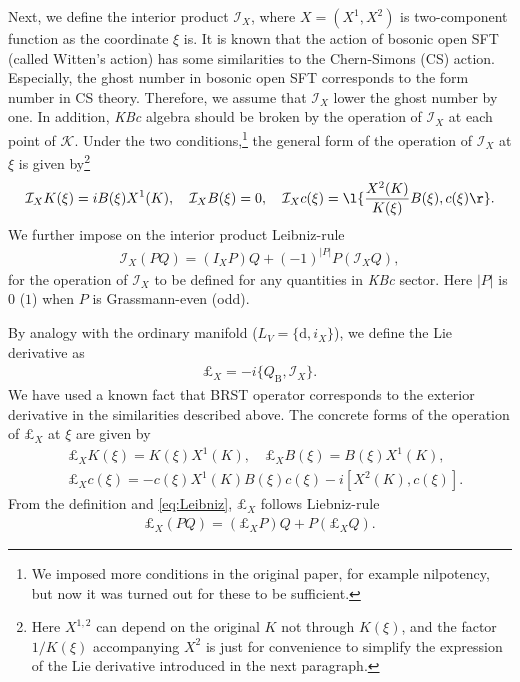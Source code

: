 \documentclass[12pt]{article}
\begin{document}
Next, we define the interior product $\mathcal I_X$, where $X = (X^1,X^2)$ is two-component function as the coordinate $\xi$ is.
It is known that the action of bosonic open SFT (called Witten's action) has some similarities to the Chern-Simons (CS) action.
Especially, the ghost number in bosonic open SFT corresponds to the form number in CS theory.
Therefore, we assume that $\mathcal I_X$ lower the ghost number by one.
In addition, \textit{KBc} algebra should be broken by the operation of $\mathcal I_X$ at each point of $\mathcal K$.
Under the two conditions,\footnote{
We imposed more conditions in the original paper, for example nilpotency, but now it was turned out for these to be sufficient.}
the general form of the operation of $\mathcal I_X$ at $\xi$ is given by\footnote{
Here $X^{1,2}$ can depend on the original $K$ not through $K(\xi)$, and the factor $1/K(\xi)$ accompanying $X^2$ is just for convenience to simplify the expression of the Lie derivative introduced in the next paragraph.
}
\begin{align}
	\mathcal I_X K(\xi)= iB(\xi)X^1(K),\quad
	\mathcal I_X B(\xi) = 0,\quad
	\mathcal I_X c(\xi) = \l\{\frac{X^2(K)}{K(\xi)}B(\xi),c(\xi)\r\}.
\end{align}
We further impose on the interior product Leibniz-rule
\begin{align}
	\mathcal I_X (PQ) = (I_X P)Q + (-1)^{|P|}P(\mathcal I_X Q),\label{eq:Leibniz}
\end{align}
for the operation of $\mathcal I_X$ to be defined for any quantities in \textit{KBc} sector.
Here $|P|$ is $0$ ($1$) when $P$ is Grassmann-even (odd).

By analogy with the ordinary manifold ($L_V = \{\mathrm{d},i_X\}$), we define the Lie derivative as
\begin{align}
	\pounds_X = -i\{Q_\mathrm{B},\mathcal I_X\}.
\end{align}
We have used a known fact that BRST operator corresponds to the exterior derivative in the similarities described above.
The concrete forms of the operation of $\pounds_X$ at $\xi$ are given by
\begin{align}
	&\pounds_X K(\xi) = K(\xi)X^1(K),\quad
	\pounds_X B(\xi) = B(\xi)X^1(K),\nonumber\\
	&\pounds_X c(\xi) = -c(\xi)X^1(K)B(\xi)c(\xi) - i[X^2(K),c(\xi)].
\end{align}
From the definition and  \eqref{eq:Leibniz}, $\pounds_X$ follows Liebniz-rule
\begin{align}
		\pounds_X (PQ) = (\pounds_X P)Q + P(\pounds_X Q).
\end{align}
\end{document}
